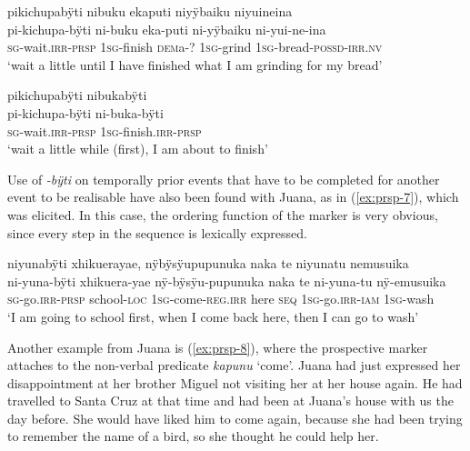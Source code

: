 \ea\label{ex:prsp-6}
\begingl
\glpreamble pikichupabÿti nibuku ekaputi niyÿbaiku niyuineina\\
\gla pi-kichupa-bÿti ni-buku eka-puti ni-yÿbaiku ni-yui-ne-ina\\
\textsc{sg}-wait.\textsc{irr}-\textsc{prsp} 1\textsc{sg}-finish \textsc{dem}a-? 1\textsc{sg}-grind 1\textsc{sg}-bread-\textsc{possd}-\textsc{irr.nv}\\
\glft ‘wait a little until I have finished what I am grinding for my bread’
\endgl
\trailingcitation{[rxx-e150220s-1.10]}
\xe

\ea\label{ex:prsp-11}
\begingl
\glpreamble pikichupabÿti nibukabÿti\\
\gla pi-kichupa-bÿti ni-buka-bÿti\\
\textsc{sg}-wait.\textsc{irr}-\textsc{prsp} 1\textsc{sg}-finish.\textsc{irr}-\textsc{prsp} \\
\glft ‘wait a little while (first), I am about to finish’
\endgl
\trailingcitation{[rxx-e150220s-1.11]}
\xe

Use of \textit{-bÿti} on temporally prior events that have to be completed for another event to be realisable have also been found with Juana, as in (\ref{ex:prsp-7}), which was elicited. In this case, the ordering function of the marker is very obvious, since every step in the sequence is lexically expressed. 

\ea\label{ex:prsp-7}
\begingl
\glpreamble niyunabÿti xhikuerayae, nÿbÿsÿupupunuka naka te niyunatu nemusuika\\
\gla ni-yuna-bÿti xhikuera-yae nÿ-bÿsÿu-pupunuka naka te ni-yuna-tu nÿ-emusuika\\
\textsc{sg}-go.\textsc{irr}-\textsc{prsp} school-\textsc{loc} 1\textsc{sg}-come-\textsc{reg.irr} here \textsc{seq} 1\textsc{sg}-go.\textsc{irr}-\textsc{iam} 1\textsc{sg}-wash\\
\glft ‘I am going to school first, when I come back here, then I can go to wash’
\endgl
\trailingcitation{[jxx-e190210s-01]}
\xe

Another example from Juana is (\ref{ex:prsp-8}), where the prospective marker attaches to the non-verbal predicate \textit{kapunu} ‘come’. Juana had just expressed her disappointment at her brother Miguel not visiting her at her house again. He had travelled to Santa Cruz at that time and had been at Juana’s house with us the day before. She would have liked him to come again, because she had been trying to remember the name of a bird, so she thought he could help her.

